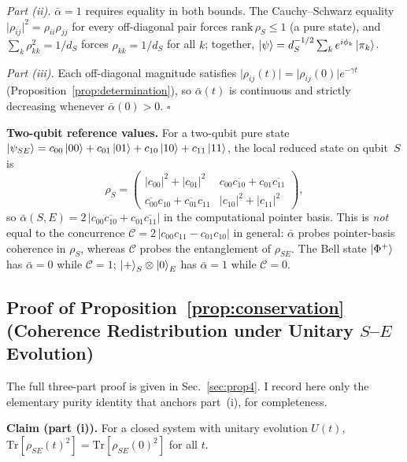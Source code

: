 \textit{Part (ii).}
$\bar\alpha = 1$ requires equality in both bounds.
The Cauchy--Schwarz equality
$\lvert\rho_{ij}\rvert^2 = \rho_{ii}\rho_{jj}$ for every off-diagonal
pair forces $\mathrm{rank}\,\rho_S \leq 1$ (a pure state), and
$\sum_k\rho_{kk}^2 = 1/d_S$ forces $\rho_{kk} = 1/d_S$ for all $k$;
together,
$\ket{\psi} = d_S^{-1/2}\sum_k e^{i\phi_k}\ket{\pi_k}$.

\textit{Part (iii).}
Each off-diagonal magnitude satisfies
$\lvert\rho_{ij}(t)\rvert = \lvert\rho_{ij}(0)\rvert e^{-\gamma t}$
(Proposition~\ref{prop:determination}), so $\bar\alpha(t)$ is
continuous and strictly decreasing whenever $\bar\alpha(0)>0$.
$\square$

\textbf{Two-qubit reference values.}
For a two-qubit pure state
$\ket{\psi_{SE}} = c_{00}\ket{00} + c_{01}\ket{01}
                  + c_{10}\ket{10} + c_{11}\ket{11}$,
the local reduced state on qubit~$S$ is
\begin{equation*}
  \rho_S = \begin{pmatrix}
    \lvert c_{00}\rvert^2 + \lvert c_{01}\rvert^2 &
    c_{00}\overline{c_{10}} + c_{01}\overline{c_{11}} \\[2pt]
    \overline{c_{00}}c_{10} + \overline{c_{01}}c_{11} &
    \lvert c_{10}\rvert^2 + \lvert c_{11}\rvert^2
  \end{pmatrix},
\end{equation*}
so $\bar\alpha(S,E) = 2\,\lvert c_{00}\overline{c_{10}}
                      + c_{01}\overline{c_{11}}\rvert$
in the computational pointer basis.
This is \emph{not} equal to the concurrence
$\mathcal{C} = 2\,\lvert c_{00}c_{11} - c_{01}c_{10}\rvert$ in general:
$\bar\alpha$ probes pointer-basis coherence in $\rho_S$, whereas
$\mathcal{C}$ probes the entanglement of $\rho_{SE}$. The Bell state
$\ket{\Phi^+}$ has $\bar\alpha = 0$ while $\mathcal{C} = 1$;
$\ket{+}_S\otimes\ket{0}_E$ has $\bar\alpha = 1$ while $\mathcal{C} = 0$.

\subsection{Proof of Proposition~\ref{prop:conservation} (Coherence Redistribution under Unitary $S$--$E$ Evolution)}

The full three-part proof is given in Sec.~\ref{sec:prop4}.
I record here only the elementary purity identity that anchors
part~(i), for completeness.

\textbf{Claim (part (i)).}
For a closed system with unitary evolution $U(t)$,
$\mathrm{Tr}[\rho_{SE}(t)^2] = \mathrm{Tr}[\rho_{SE}(0)^2]$ for all $t$.

